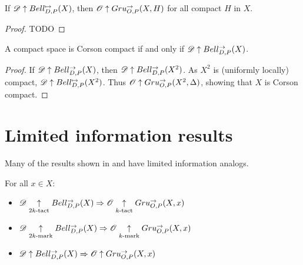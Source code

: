 \begin{thm}
  If $\mathscr{D}\uparrow Bell_{D,P}^{\mapsto}(X)$, then $\mathscr{O}\uparrow Gru_{O,P}^{\to}(X,H)$ for
  all compact $H$ in $X$.
\end{thm}

\begin{proof}
  TODO
\end{proof}

\begin{cor}
  A compact space is Corson compact if and only if
  $\mathscr{D} \uparrow Bell_{D,P}^{\to}(X)$.
\end{cor}

\begin{proof}
  If $\mathscr{D} \uparrow Bell_{D,P}^{\to}(X)$, then $\mathscr{D} \uparrow Bell_{D,P}^{\to}(X^2)$.
  As $X^2$ is (uniformly locally) compact, $\mathscr{D} \uparrow Bell_{D,P}^{\mapsto}(X^2)$.
  Thus $\mathscr{O}\uparrow Gru_{O,P}^{\to}(X^2,\Delta)$, showing that $X$ is Corson compact.
\end{proof}



\section{Limited information results}

Many of the results shown in \cite{MR3239205} and \cite{nyikosProximalPreprint}
have limited information analogs.

\begin{thm}
For all $x\in X$:
  \begin{itemize}
    \item
      $\mathscr{D}\underset{2k\text{-tact}}{\uparrow} Bell_{D,P}^{\to}(X) \Rightarrow \mathscr{O} \underset{k\text{-tact}}{\uparrow} Gru_{O,P}^{\to}(X,x)$
    \item
      $\mathscr{D}\underset{2k\text{-mark}}{\uparrow} Bell_{D,P}^{\to}(X) \Rightarrow \mathscr{O} \underset{k\text{-mark}}{\uparrow} Gru_{O,P}^{\to}(X,x)$
    \item
      $\mathscr{D}\uparrow Bell_{D,P}^{\to}(X) \Rightarrow \mathscr{O} \uparrow Gru_{O,P}^{\to}(X,x)$
  \end{itemize}
\end{thm}

